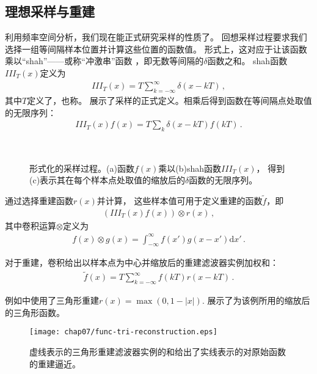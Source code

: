 \subsection{理想采样与重建}\label{sub:理想采样与重建}
利用频率空间分析，我们现在能正式研究采样的性质了。
回想采样过程要求我们选择一组等间隔样本位置并计算这些位置的函数值。
形式上，这对应于让该函数乘以“shah”——或称“冲激串”函数
，即无数等间隔的$\delta$函数之和。
shah函数$III_T(x)$定义为
\begin{align*}
    III_T(x)=T\sum\limits_{k=-\infty}^{\infty}\delta(x-kT)\, ,
\end{align*}
其中$T$定义了，也称。
展示了采样的正式定义。相乘后得到函数在等间隔点处取值的无限序列：
\begin{align*}
    III_T(x)f(x)=T\sum\limits_k\delta(x-kT)f(kT)\, .
\end{align*}
\begin{figure}[htbp]
    \centering
    \,
    \,
    \caption{形式化的采样过程。(a)函数$f(x)$乘以(b)shah函数$III_T(x)$，
        得到(c)表示其在每个样本点处取值的缩放后的$\delta$函数的无限序列。}
    \label{fig:7.4}
\end{figure}

通过选择重建函数$r(x)$并计算，
这些样本值可用于定义重建的函数$\tilde{f}$，即
\begin{align*}
    (III_T(x)f(x))\otimes r(x)\, ,
\end{align*}
其中卷积运算$\otimes$定义为
\begin{align*}
    f(x)\otimes g(x)=\int_{-\infty}^{\infty}f(x')g(x-x')\mathrm{d}x'\, .
\end{align*}

对于重建，卷积给出以样本点为中心并缩放后的重建滤波器实例加权和：
\begin{align*}
    \tilde{f}(x)=T\sum\limits_{k=-\infty}^{\infty}f(kT)r(x-kT)\, .
\end{align*}

例如中使用了三角形重建$r(x)=\max(0,1-|x|)$.
展示了为该例所用的缩放后的三角形函数。
\begin{figure}[htbp]
    \centering\texttt{[image: chap07/func-tri-reconstruction.eps]}
    \caption{虚线表示的三角形重建滤波器实例的和给出了实线表示的对原始函数的重建逼近。}
    \label{fig:7.5}
\end{figure}

